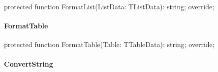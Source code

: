 \documentclass{report}
\newif\ifpdf
\begin{document}
\label{PasDoc_GenPHP.TPHPDocGenerator-FormatList}
\begin{list}{}{
\setlength{\itemindent}{0cm}
\setlength{\listparindent}{0cm}
\setlength{\leftmargin}{\evensidemargin}
\addtolength{\leftmargin}{\tmplength}
\settowidth{\labelsep}{X}
\addtolength{\leftmargin}{\labelsep}
\setlength{\labelwidth}{\tmplength}
}
\item[\textbf{Declaration}\hfill]
\ifpdf
\begin{flushleft}
\fi
\begin{ttfamily}
protected function FormatList(ListData: TListData): string; override;\end{ttfamily}

\ifpdf
\end{flushleft}
\fi

\end{list}
\paragraph*{FormatTable}\hspace*{\fill}

\label{PasDoc_GenPHP.TPHPDocGenerator-FormatTable}
\begin{list}{}{
\setlength{\itemindent}{0cm}
\setlength{\listparindent}{0cm}
\setlength{\leftmargin}{\evensidemargin}
\addtolength{\leftmargin}{\tmplength}
\settowidth{\labelsep}{X}
\addtolength{\leftmargin}{\labelsep}
\setlength{\labelwidth}{\tmplength}
}
\item[\textbf{Declaration}\hfill]
\ifpdf
\begin{flushleft}
\fi
\begin{ttfamily}
protected function FormatTable(Table: TTableData): string; override;\end{ttfamily}

\ifpdf
\end{flushleft}
\fi

\end{list}
\paragraph*{ConvertString}\hspace*{\fill}
\end{document}
